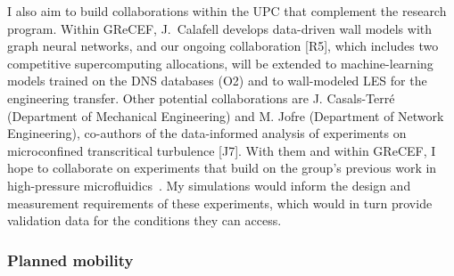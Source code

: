 \documentclass[11pt]{article}
\begin{document}
I also aim to build collaborations within the UPC that
complement the research program.
Within GReCEF, J.\ Calafell develops data-driven wall models with graph neural networks, and our ongoing collaboration [R5], which includes two competitive supercomputing allocations, will be extended to machine-learning models trained on the DNS databases (O2) and to wall-modeled LES for the engineering transfer.
Other potential collaborations are J. Casals-Terr\'e (Department of Mechanical Engineering) and M. Jofre (Department of Network Engineering), co-authors of the data-informed analysis of experiments on microconfined transcritical turbulence [J7].
With them and within GReCEF, I hope to collaborate on experiments that build on the group's previous work in high-pressure microfluidics~\cite{Hurtan2025}. My simulations would inform the design and measurement requirements of these experiments, which would in turn provide validation data for the conditions they can access.

\subsubsection{Planned mobility}\label{sec:stays}
\end{document}
